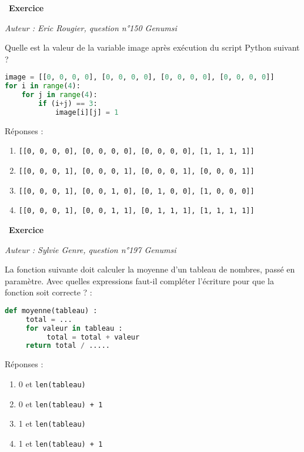 \documentclass[
  11pt,
]{article}
\newcommand{\passthrough}[1]{#1}
\providecommand{\tightlist}{%
  \setlength{\itemsep}{0pt}\setlength{\parskip}{0pt}}
\newcounter{exo}
\newenvironment{exercice}[1]
{\par \medskip   \addtocounter{exo}{1} \noindent  
\begin{bclogo}[arrondi =0.1,   noborder = true, logo=\bccrayon, marge=4]{~\textbf{Exercice} \textbf{\theexo} {\itshape #1} }  \par}
{
\end{bclogo}
 \par \bigskip }
\newcounter{def}
\begin{document}
\begin{exercice}{}

\emph{Auteur : Eric Rougier, question n°150 Genumsi}

Quelle est la valeur de la variable image après exécution du script
Python suivant ?

\begin{lstlisting}[language=Python]
image = [[0, 0, 0, 0], [0, 0, 0, 0], [0, 0, 0, 0], [0, 0, 0, 0]]
for i in range(4):
    for j in range(4):
        if (i+j) == 3:
            image[i][j] = 1
\end{lstlisting}

Réponses :

\begin{enumerate}
\def\labelenumi{\Alph{enumi})}
\item
  \passthrough{\lstinline![[0, 0, 0, 0], [0, 0, 0, 0], [0, 0, 0, 0], [1, 1, 1, 1]]!}
\item
  \passthrough{\lstinline![[0, 0, 0, 1], [0, 0, 0, 1], [0, 0, 0, 1], [0, 0, 0, 1]]!}
\item
  \passthrough{\lstinline![[0, 0, 0, 1], [0, 0, 1, 0], [0, 1, 0, 0], [1, 0, 0, 0]]!}
\item
  \passthrough{\lstinline![[0, 0, 0, 1], [0, 0, 1, 1], [0, 1, 1, 1], [1, 1, 1, 1]]!}
\end{enumerate}

\end{exercice}

\begin{exercice}{}

\emph{Auteur : Sylvie Genre, question n°197 Genumsi}

La fonction suivante doit calculer la moyenne d'un tableau de nombres,
passé en paramètre. Avec quelles expressions faut-il compléter
l'écriture pour que la fonction soit correcte ? :

\begin{lstlisting}[language=Python]
def moyenne(tableau) :
     total = ...
     for valeur in tableau :
          total = total + valeur
     return total / .....
\end{lstlisting}

Réponses :

\begin{enumerate}
\def\labelenumi{\Alph{enumi})}
\tightlist
\item
  0 et \passthrough{\lstinline!len(tableau)!}
\item
  0 et \passthrough{\lstinline!len(tableau) + 1!}
\item
  1 et \passthrough{\lstinline!len(tableau)!}
\item
  1 et \passthrough{\lstinline!len(tableau) + 1!}
\end{enumerate}

\end{exercice}
\end{document}
